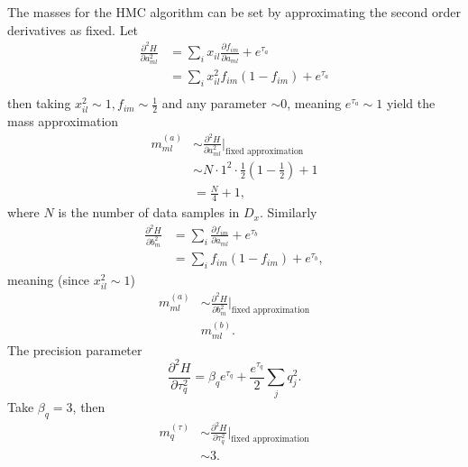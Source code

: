 \documentclass[a4paper,11pt, oneside]{article}
\theoremstyle{definition}
\begin{document}
	The masses for the HMC algorithm can be set by approximating the second order derivatives as fixed. Let
	\begin{equation}
		\begin{split}
			\frac{\partial^2 H}{\partial a_{ml}^2} &= \sum_ix_{il}\frac{\partial f_{im}}{\partial a_{ml}}+e^{\tau_a}\\
			& =\sum_ix_{il}^2f_{im}( 1- f_{im})+e^{\tau_a}\\
		\end{split}
	\end{equation}
	then taking $x_{il}^2\sim 1, f_{im}\sim \frac{1}{2}$ and any parameter $\sim 0$, meaning $e^{\tau_a} \sim 1$ yield the mass approximation
	\begin{equation}
		\begin{split}
			m_{ml}^{(a)} &\sim \frac{\partial^2 H}{\partial a_{ml}^2}\bigg|_{\text{fixed approximation}}\\
			& \sim N\cdot 1^2\cdot \frac{1}{2}(1-\frac{1}{2})+1\\
			&=\frac{N}{4} +1,
		\end{split}
	\end{equation}
	where $N$ is the number of data samples in $D_x$. Similarly
	\begin{equation}
		\begin{split}
			\frac{\partial^2 H}{\partial b_m^2} &= \sum_i\frac{\partial f_{im}}{\partial a_{ml}}+e^{\tau_b}\\
			& =\sum_if_{im}( 1- f_{im})+e^{\tau_b},
		\end{split}
	\end{equation}
	meaning (since $x_{il}^2\sim 1$)
	\begin{equation}
		\begin{split}
			m_{ml}^{(a)} &\sim \frac{\partial^2 H}{\partial b_{m}^2}\bigg|_{\text{fixed approximation}}\\
			& m_{ml}^{(b)}.
		\end{split}
	\end{equation}
	The precision parameter
	\begin{equation}
		\frac{\partial^2 H}{\partial \tau_q^2} = \beta_qe^{\tau_q}+\frac{e^{\tau_q}}{2}\sum_jq_j^2.
	\end{equation}
	Take $\beta_q = 3$, then
	\begin{equation}
		\begin{split}
			m_{q}^{(\tau)} &\sim \frac{\partial^2 H}{\partial \tau_{q}^2}\bigg|_{\text{fixed approximation}}\\
			&\sim 3.
		\end{split}
	\end{equation}
	
\end{document}

